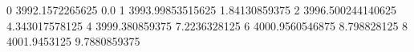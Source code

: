 0 3992.1572265625 0.0
1 3993.99853515625 1.84130859375
2 3996.500244140625 4.343017578125
4 3999.380859375 7.2236328125
6 4000.9560546875 8.798828125
8 4001.9453125 9.7880859375
